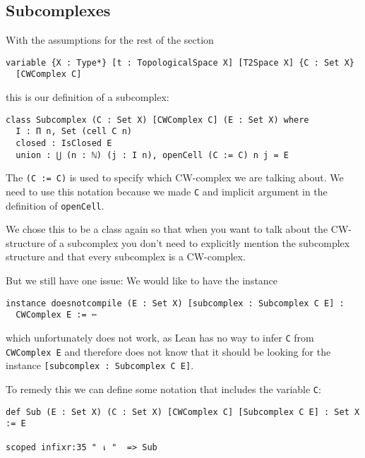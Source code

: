 \subsection{Subcomplexes}

With the assumptions for the rest of the section

\begin{lstlisting}
variable {X : Type*} [t : TopologicalSpace X] [T2Space X] {C : Set X} 
  [CWComplex C]
\end{lstlisting}

this is our definition of a subcomplex:
\href{https://github.com/scholzhannah/CWComplexes/blob/7be4872a05b534011cc969eb5b80a4b7f0bf57e2/CWcomplexes/subcomplex.lean#L44-L52}{\faExternalLink}

\begin{lstlisting}
class Subcomplex (C : Set X) [CWComplex C] (E : Set X) where
  I : Π n, Set (cell C n)
  closed : IsClosed E
  union : ⋃ (n : ℕ) (j : I n), openCell (C := C) n j = E
\end{lstlisting}

The \lstinline{(C := C)} is used to specify which CW-complex we are talking about. 
We need to use this notation because we made \lstinline{C} and implicit argument in the definition of \lstinline{openCell}.

We chose this to be a class again so that when you want to talk about the CW-structure of a subcomplex you don't need to explicitly mention the subcomplex structure and that every subcomplex is a CW-complex.

But we still have one issue: 
We would like to have the instance 

\begin{lstlisting}
instance doesnotcompile (E : Set X) [subcomplex : Subcomplex C E] : 
  CWComplex E := ⋯ 
\end{lstlisting}

which unfortunately does not work, as Lean has no way to infer \lstinline{C} from \lstinline{CWComplex E} and therefore does not know that it should be looking for the instance \lstinline{[subcomplex : Subcomplex C E]}. 

To remedy this we can define some notation that includes the variable \lstinline{C}: 
\href{https://github.com/scholzhannah/CWComplexes/blob/7be4872a05b534011cc969eb5b80a4b7f0bf57e2/CWcomplexes/subcomplex.lean#L110-L115}{\faExternalLink}

\begin{lstlisting}
def Sub (E : Set X) (C : Set X) [CWComplex C] [Subcomplex C E] : Set X := E

scoped infixr:35 " ⇂ "  => Sub
\end{lstlisting}

